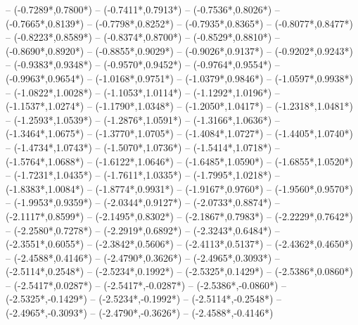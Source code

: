 {	-- ({-0.7289*\dx},{0.7800*\dy})
	-- ({-0.7411*\dx},{0.7913*\dy})
	-- ({-0.7536*\dx},{0.8026*\dy})
	-- ({-0.7665*\dx},{0.8139*\dy})
	-- ({-0.7798*\dx},{0.8252*\dy})
	-- ({-0.7935*\dx},{0.8365*\dy})
	-- ({-0.8077*\dx},{0.8477*\dy})
	-- ({-0.8223*\dx},{0.8589*\dy})
	-- ({-0.8374*\dx},{0.8700*\dy})
	-- ({-0.8529*\dx},{0.8810*\dy})
	-- ({-0.8690*\dx},{0.8920*\dy})
	-- ({-0.8855*\dx},{0.9029*\dy})
	-- ({-0.9026*\dx},{0.9137*\dy})
	-- ({-0.9202*\dx},{0.9243*\dy})
	-- ({-0.9383*\dx},{0.9348*\dy})
	-- ({-0.9570*\dx},{0.9452*\dy})
	-- ({-0.9764*\dx},{0.9554*\dy})
	-- ({-0.9963*\dx},{0.9654*\dy})
	-- ({-1.0168*\dx},{0.9751*\dy})
	-- ({-1.0379*\dx},{0.9846*\dy})
	-- ({-1.0597*\dx},{0.9938*\dy})
	-- ({-1.0822*\dx},{1.0028*\dy})
	-- ({-1.1053*\dx},{1.0114*\dy})
	-- ({-1.1292*\dx},{1.0196*\dy})
	-- ({-1.1537*\dx},{1.0274*\dy})
	-- ({-1.1790*\dx},{1.0348*\dy})
	-- ({-1.2050*\dx},{1.0417*\dy})
	-- ({-1.2318*\dx},{1.0481*\dy})
	-- ({-1.2593*\dx},{1.0539*\dy})
	-- ({-1.2876*\dx},{1.0591*\dy})
	-- ({-1.3166*\dx},{1.0636*\dy})
	-- ({-1.3464*\dx},{1.0675*\dy})
	-- ({-1.3770*\dx},{1.0705*\dy})
	-- ({-1.4084*\dx},{1.0727*\dy})
	-- ({-1.4405*\dx},{1.0740*\dy})
	-- ({-1.4734*\dx},{1.0743*\dy})
	-- ({-1.5070*\dx},{1.0736*\dy})
	-- ({-1.5414*\dx},{1.0718*\dy})
	-- ({-1.5764*\dx},{1.0688*\dy})
	-- ({-1.6122*\dx},{1.0646*\dy})
	-- ({-1.6485*\dx},{1.0590*\dy})
	-- ({-1.6855*\dx},{1.0520*\dy})
	-- ({-1.7231*\dx},{1.0435*\dy})
	-- ({-1.7611*\dx},{1.0335*\dy})
	-- ({-1.7995*\dx},{1.0218*\dy})
	-- ({-1.8383*\dx},{1.0084*\dy})
	-- ({-1.8774*\dx},{0.9931*\dy})
	-- ({-1.9167*\dx},{0.9760*\dy})
	-- ({-1.9560*\dx},{0.9570*\dy})
	-- ({-1.9953*\dx},{0.9359*\dy})
	-- ({-2.0344*\dx},{0.9127*\dy})
	-- ({-2.0733*\dx},{0.8874*\dy})
	-- ({-2.1117*\dx},{0.8599*\dy})
	-- ({-2.1495*\dx},{0.8302*\dy})
	-- ({-2.1867*\dx},{0.7983*\dy})
	-- ({-2.2229*\dx},{0.7642*\dy})
	-- ({-2.2580*\dx},{0.7278*\dy})
	-- ({-2.2919*\dx},{0.6892*\dy})
	-- ({-2.3243*\dx},{0.6484*\dy})
	-- ({-2.3551*\dx},{0.6055*\dy})
	-- ({-2.3842*\dx},{0.5606*\dy})
	-- ({-2.4113*\dx},{0.5137*\dy})
	-- ({-2.4362*\dx},{0.4650*\dy})
	-- ({-2.4588*\dx},{0.4146*\dy})
	-- ({-2.4790*\dx},{0.3626*\dy})
	-- ({-2.4965*\dx},{0.3093*\dy})
	-- ({-2.5114*\dx},{0.2548*\dy})
	-- ({-2.5234*\dx},{0.1992*\dy})
	-- ({-2.5325*\dx},{0.1429*\dy})
	-- ({-2.5386*\dx},{0.0860*\dy})
	-- ({-2.5417*\dx},{0.0287*\dy})
	-- ({-2.5417*\dx},{-0.0287*\dy})
	-- ({-2.5386*\dx},{-0.0860*\dy})
	-- ({-2.5325*\dx},{-0.1429*\dy})
	-- ({-2.5234*\dx},{-0.1992*\dy})
	-- ({-2.5114*\dx},{-0.2548*\dy})
	-- ({-2.4965*\dx},{-0.3093*\dy})
	-- ({-2.4790*\dx},{-0.3626*\dy})
	-- ({-2.4588*\dx},{-0.4146*\dy})
}
